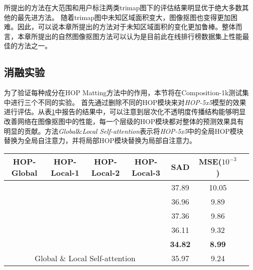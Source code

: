 所提出的方法在大范围和用户标注两类trimap图下的评估结果明显优于绝大多数其他的最先进方法。 随着trimap图中未知区域面积变大，图像抠图也变得更加困难。因此，可以说本章所提出的方法对于未知区域面积的变化更加鲁棒。整体而言，本章所提出的自然图像抠图方法可以认为是目前此在线排行榜数据集上性能最佳的方法之一。

\subsection{消融实验}
为了验证每种成分在HOP Matting方法中的作用，本节将在Composition-1k测试集中进行三个不同的实验。
首先通过删除不同的HOP模块来对\textit{HOP-5x5}模型的效果进行评估。从表\ref{tab5:block}中报告的结果中，可以注意到层次化不透明度传播结构能够明显改善网络在图像抠图中的性能，每一个层级的HOP模块都对整体的预测效果具有明显的贡献。方法\textit{Global}\&\textit{Local Self-attention}表示将\textit{HOP-5x5}中的全局HOP模块替换为全局自注意力，并将局部HOP模块替换为局部自注意力。


\begin{table}[t]
	\setlength{\tabcolsep}{8pt}
	\centering
	\begin{tabular}{cccc|ccc}  
		\toprule
		HOP-Global &HOP-Local-1 &HOP-Local-2 &HOP-Local-3& SAD& MSE($10^{-3}$) \\%
		\midrule
		&&& & 37.89  & 10.05   \\%
		\checkmark&&& & 36.96 & 9.89  \\%
		\checkmark&\checkmark&&& 37.36  & 9.86 \\%
		\checkmark&\checkmark&\checkmark& & 36.11 & 9.32 \\%
		\checkmark&\checkmark&\checkmark&\checkmark& \textbf{34.82} & \textbf{8.99}\\%
		\midrule
		\multicolumn{4}{c|}{Global \& Local Self-attention}&  35.97 & 9.24 \\%
		\bottomrule
	\end{tabular}
	\label{tab5:block}
\end{table}

